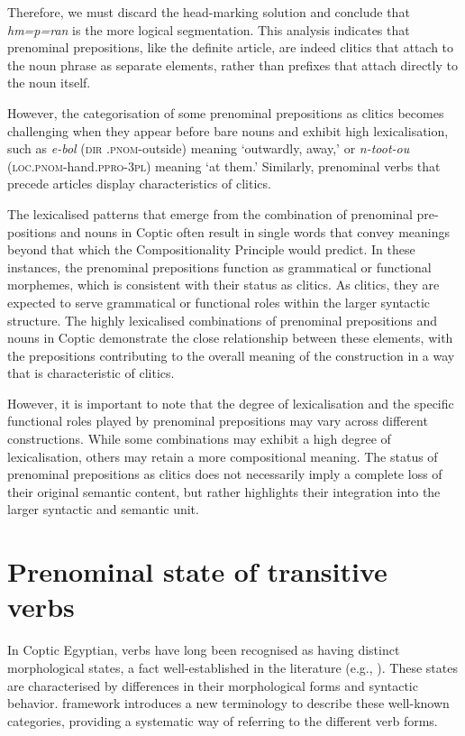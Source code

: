 \documentclass[output=paper,colorlinks,citecolor=brown ,chinesefont]{langscibook}
\begin{document}
Therefore, we must discard the head-marking solution and conclude that  \textit{hm=p=ran} is the more logical segmentation. This analysis indicates that prenominal prepositions, like the definite article, are indeed clitics that attach to the noun phrase as separate elements, rather than prefixes that attach directly to the noun itself.

However, the categorisation of some prenominal prepositions as clitics becomes challenging when they appear before bare nouns and exhibit high lexicalisation, such as  \textit{e-bol} (\textsc{dir} .\textsc{pnom}-outside) meaning ‘outwardly, away,' or  \textit{n-toot-ou} (\textsc{loc}.\textsc{pnom}-hand.\textsc{ppro}-3\textsc{pl}) meaning ‘at them.' Similarly, prenominal verbs that precede articles display characteristics of clitics.

The lexicalised patterns that emerge from the combination of prenominal pre-positions and nouns in Coptic often result in single words that convey meanings beyond that which the Compositionality Principle would predict. In these instances, the prenominal prepositions function as grammatical or functional morphemes, which is consistent with their status as clitics. As clitics, they are expected to serve grammatical or functional roles within the larger syntactic structure. The highly lexicalised combinations of prenominal prepositions and nouns in Coptic demonstrate the close relationship between these elements, with the prepositions contributing to the overall meaning of the construction in a way that is characteristic of clitics.

However, it is important to note that the degree of lexicalisation and the specific functional roles played by prenominal prepositions may vary across different constructions. While some combinations may exhibit a high degree of lexicalisation, others may retain a more compositional meaning. The status of prenominal prepositions as clitics does not necessarily imply a complete loss of their original semantic content, but rather highlights their integration into the larger syntactic and semantic unit.

\section{Prenominal state of transitive verbs}

In Coptic Egyptian, verbs have long been recognised as having distinct morphological states, a fact well-established in the literature (e.g., \citealt{stern,steindorffgrammar,polotsky}). These states are characterised by differences in their morphological forms and syntactic behavior.  framework introduces a new terminology to describe these well-known categories, providing a systematic way of referring to the different verb forms.
\end{document}

